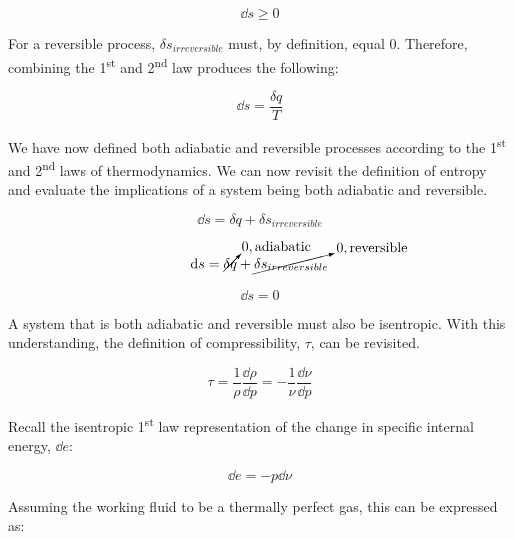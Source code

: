 \documentclass[12pt,letterpaper]{article}
\begin{document}
\begin{enumerate}[label=(\alph*)]
\begin{enumerate}[label=\arabic*.]
					\begin{equation*}
						\dd s \ge 0
					\end{equation*}
					
					For a reversible process, $\delta s_{irreversible}$ must, by definition, equal 0. Therefore, combining the 1\textsuperscript{st} and 2\textsuperscript{nd} law produces the following:
					
					\begin{equation*}
						\dd s = \frac{\delta q}{T}
					\end{equation*}
					
					We have now defined both adiabatic and reversible processes according to the 1\textsuperscript{st} and 2\textsuperscript{nd} laws of thermodynamics. We can now revisit the definition of entropy and evaluate the implications of a system being both adiabatic and reversible.
					
					\begin{equation*}
						\dd s = \delta q + \delta s_{irreversible}
					\end{equation*}
				
					\begin{equation*}
						\dd s = \cancelto{0, \mathrm{adiabatic}}{\delta q} + \cancelto{0, \mathrm{reversible}}{\delta s_{irreversible}}				
					\end{equation*}
					
					\begin{equation*}
						\boxed{\dd s = 0}
					\end{equation*}
				
					A system that is both adiabatic and reversible must also be isentropic. With this understanding, the definition of compressibility, $\tau$, can be revisited.
				
					\begin{equation*}
						\tau = \frac{1}{\rho}\frac{\dd \rho}{\dd p} = - \frac{1}{\nu}\frac{\dd\nu}{\dd p}
					\end{equation*}
				
					Recall the isentropic 1\textsuperscript{st} law representation of the change in specific internal energy, $\dd e$:
					
					\begin{equation*}
						\dd e = - p \dd \nu
					\end{equation*}
				
					Assuming the working fluid to be a thermally perfect gas, this can be expressed as:
					

\end{enumerate}
\end{enumerate}
\end{document}
